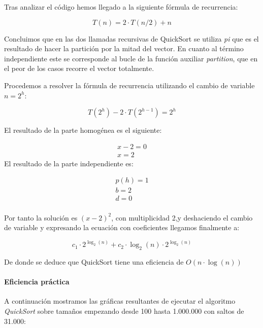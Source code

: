 \documentclass[a4paper,12pt]{article} %
\begin{document}
Tras analizar el código hemos llegado a la siguiente fórmula de recurrencia:

\begin{equation*}
	T(n) = 2\cdot T(n/2) + n
\end{equation*}

Concluimos que en las dos llamadas recursivas de QuickSort
se utiliza \textit{pi} que es el resultado de hacer la partición por la mitad del vector. En cuanto
al término independiente este se corresponde al bucle de la función auxiliar \textit{partition}, que en
el peor de los casos recorre el vector totalmente.

Procedemos a resolver la fórmula de recurrencia utilizando el cambio de variable $n=2^h$:

\begin{equation*}
	T(2^{h}) - 2\cdot T(2^{h-1}) = 2^{h}
\end{equation*}

El resultado de la parte homogénea es el siguiente:

\begin{align*}
	x - 2 = 0 \\
	x = 2
\end{align*}
\newpage
El resultado de la parte independiente es:

\begin{align*}
	p(h) = 1 \\
	b = 2    \\
	d = 0    \\
\end{align*}

Por tanto la solución es $(x-2)^2$, con multiplicidad 2,y deshaciendo el
cambio de variable y expresando la ecuación con coeficientes llegamos finalmente
a:

\begin{equation*}
	c_{1}\cdot 2^{\log _{2}(n)} + c_{2}\cdot \log_{2}(n)\cdot 2^{\log_{2}(n)}
\end{equation*}

De donde se deduce que QuickSort tiene una eficiencia de $O(n\cdot \log(n))$
\\ 
\paragraph{Eficiencia práctica}

A continuación mostramos las gráficas resultantes de ejecutar el algoritmo \textit{QuickSort} 
sobre tamaños empezando desde 100 hasta 1.000.000 con saltos de 31.000:
\end{document}
